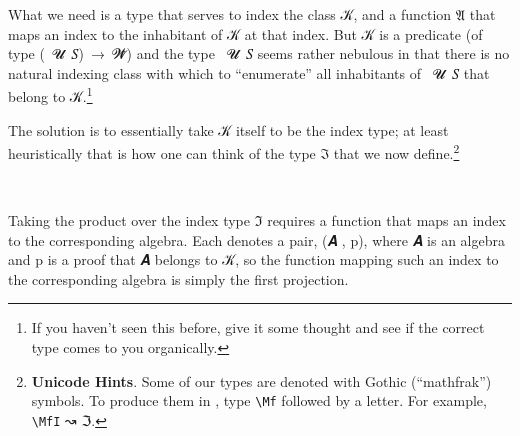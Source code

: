 What we need is a type that serves to index the class \ab 𝒦, and a function \af 𝔄 that maps an index to the inhabitant of \ab 𝒦 at that index. But \ab 𝒦 is a predicate (of type (~\ab 𝓤~\ab 𝑆)~\as →~\ab 𝓦\af ̇) and the type ~\ab 𝓤~\ab 𝑆 seems rather nebulous in that there is no natural indexing class with which to ``enumerate'' all inhabitants of ~\ab 𝓤~\ab 𝑆 that belong to \ab 𝒦.\footnote{%
If you haven't seen this before, give it some thought and see if the correct type comes to you organically.}


The solution is to essentially take \ab 𝒦 itself to be the index type; at least heuristically that is how one can think of the type \af ℑ that we now define.\footnote{\textbf{Unicode Hints}. Some of our types are denoted with Gothic (``mathfrak'') symbols. To produce them in \agdamode, type \texttt{\textbackslash{}Mf} followed by a letter. For example, \texttt{\textbackslash{}MfI} ↝ \af ℑ.}
\ccpad
\begin{code}%
\>[0][@{}l@{\AgdaIndent{0}}]%
\>[1]\AgdaSpace{}%
\AgdaSymbol{:}\AgdaSpace{}%
\AgdaSpace{}%
\AgdaSpace{}%
\<%
\\
%
\>[1]\AgdaSpace{}%
\AgdaSymbol{=}\AgdaSpace{}%
\AgdaSpace{}%
\AgdaSpace{}%
\AgdaSpace{}%
\AgdaSymbol{(}\AgdaSpace{}%
\AgdaSpace{}%
\AgdaSymbol{)}\AgdaSpace{}%
\AgdaFunction{,}\AgdaSpace{}%
\AgdaSymbol{(}\AgdaSpace{}%
\AgdaSpace{}%
\AgdaSymbol{)}\<%
\end{code}
\ccpad
Taking the product over the index type \af ℑ requires a function that maps an index  to the corresponding algebra.  Each  denotes a pair, (\ab 𝑨 , \ab p), where \ab 𝑨 is an algebra and \ab p is a proof that \ab 𝑨 belongs to \ab 𝒦, so the function mapping such an index to the corresponding algebra is simply the first projection.
